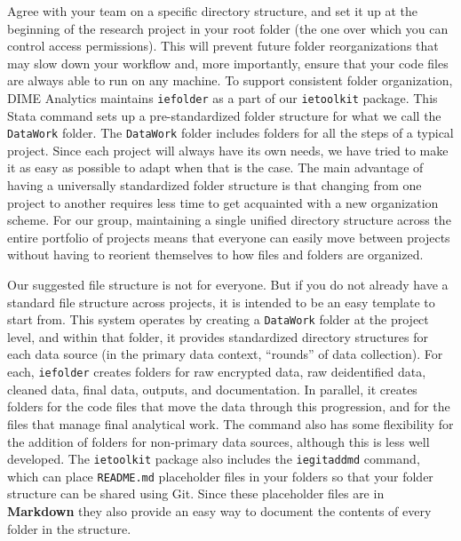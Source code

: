 Agree with your team on a specific directory structure,
and set it up at the beginning of the research project
in your root folder (the one over which you can control access permissions).
This will prevent future folder reorganizations that may slow down your workflow and,
more importantly, ensure that your code files are always able to run on any machine.
To support consistent folder organization, DIME Analytics maintains \texttt{iefolder}
as a part of our \texttt{ietoolkit} package.
This Stata command sets up a pre-standardized folder structure
for what we call the \texttt{DataWork} folder.
The \texttt{DataWork} folder includes folders for all the steps of a typical project.
Since each project will always have its own needs,
we have tried to make it as easy as possible to adapt when that is the case.
The main advantage of having a universally standardized folder structure
is that changing from one project to another requires less
time to get acquainted with a new organization scheme.
For our group, maintaining a single unified directory structure
across the entire portfolio of projects means that everyone
can easily move between projects without having to reorient
themselves to how files and folders are organized.

Our suggested file structure is not for everyone.
But if you do not already have a standard file structure across projects,
it is intended to be an easy template to start from.
This system operates by creating a \texttt{DataWork} folder at the project level,
and within that folder, it provides standardized directory structures
for each data source (in the primary data context, ``rounds'' of data collection).
For each, \texttt{iefolder} creates folders for raw encrypted data,
raw deidentified data, cleaned data, final data, outputs, and documentation.
In parallel, it creates folders for the code files
that move the data through this progression,
and for the files that manage final analytical work.
The command also has some flexibility for the addition of
folders for non-primary data sources, although this is less well developed.
The \texttt{ietoolkit} package also includes the \texttt{iegitaddmd} command,
which can place \texttt{README.md} placeholder files in your folders so that
your folder structure can be shared using Git. Since these placeholder files are in
\textbf{Markdown} they also provide an easy way
to document the contents of every folder in the structure.

